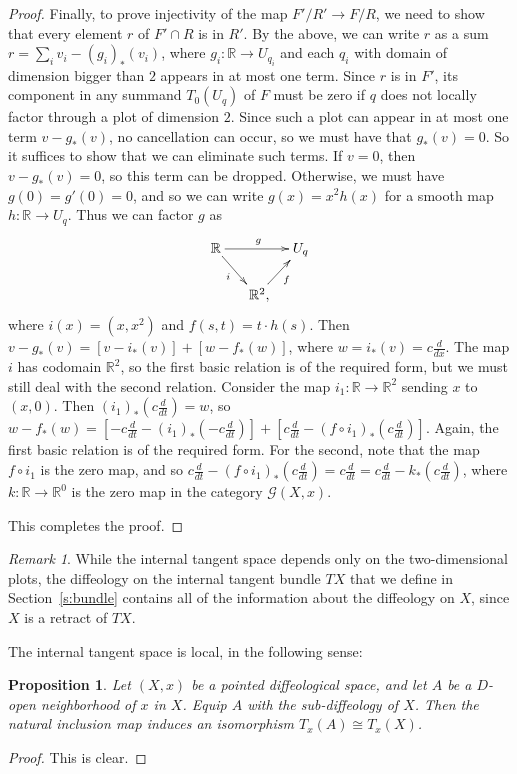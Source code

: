 \documentclass{amsart}
\newtheorem{prop}[de]{Proposition}
\theoremstyle{remark}
\newtheorem{rem}[de]{Remark}
\newcommand{\ra}{\to}
\newcommand{\cG}{{\mathcal{G}}}
\newcommand{\ddt}{{\textstyle\frac{d}{dt}}}
\def \R{\mathbb{R}}
\begin{document}
\begin{proof}
Finally, to prove injectivity of the map $F'/R' \to F/R$,
we need to show that every element $r$ of $F' \cap R$ is in $R'$.
By the above, we can write $r$ as a sum $r = \sum_i v_i - (g_i)_*(v_i)$,
where $g_i : \R \to U_{q_i}$ and each $q_i$ with domain of dimension
bigger than $2$ appears in at most one term.
Since $r$ is in $F'$, its component in any summand $T_0(U_q)$ of $F$
must be zero if $q$ does not locally factor through a plot of dimension $2$.
Since such a plot can appear in at most one term $v - g_*(v)$, no cancellation can
occur, so we must have that $g_*(v) = 0$.
So it suffices to show that we can eliminate such terms.
If $v = 0$, then $v - g_*(v) = 0$, so this term can be dropped.
Otherwise, we must have $g(0) = g'(0) = 0$, and so we can write
$g(x) = x^2 h(x)$ for a smooth map $h : \R \to U_q$.
Thus we can factor $g$ as
\[
  \xymatrix@C-10pt@R-6pt{ \R \ar[rr]^g \ar[dr]_-i && U_q \\ & \R^2 \ar[ur]_-f ,\!\!}
\]
where $i(x) = (x, x^2)$ and $f(s,t) = t \cdot h(s)$.
Then $v - g_*(v) = [v - i_*(v)] + [w - f_*(w)]$, where $w = i_*(v) = c \frac{d}{dx}$.
The map $i$ has codomain $\R^2$, so the first basic relation is of the
required form, but we must still deal with the second relation.
Consider the map $i_1 : \R \to \R^2$ sending $x$ to $(x,0)$.
Then $(i_1)_*(c \ddt) = w$, so
$w - f_*(w) = [-c\ddt - (i_1)_*(-c\ddt)] + [c\ddt - (f \circ i_1)_*(c \ddt)]$.
Again, the first basic relation is of the required form.
For the second, note that the map $f \circ i_1$ is the zero map, and so
$c \ddt - (f \circ i_1)_*(c \ddt) = c \ddt = c \ddt - k_*(c \ddt)$,
where $k : \R \ra \R^0$ is the zero map in the category $\cG(X,x)$.

This completes the proof.
\end{proof}

\begin{rem}
While the internal tangent space depends only on the two-dimensional plots, the
diffeology on the internal tangent bundle $TX$ that we define in Section~\ref{s:bundle}
contains all of the information about the diffeology on $X$, since $X$ is a retract of $TX$.
%
%
%
\end{rem}

The internal tangent space is local, in the following sense:

\begin{prop}\label{prop:internallocal}
Let $(X,x)$ be a pointed diffeological space,
and let $A$ be a $D$-open neighborhood of $x$ in $X$.
Equip $A$ with the sub-diffeology of $X$.
Then the natural inclusion map induces an isomorphism $T_x(A) \cong T_x(X)$.
\end{prop}
\begin{proof}
This is clear.
\end{proof}
\end{document}
